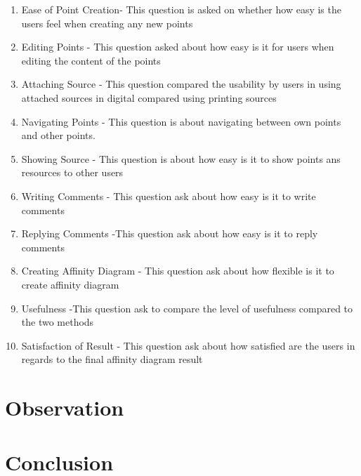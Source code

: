 \documentclass{sigchi}
\begin{document}
\begin{itemize}
\begin{itemize}
\begin{enumerate}
  \item Ease of Point Creation- This question is asked on whether how easy is the users feel when creating any new points 
  \item Editing Points - This question asked about how easy is it for users when editing the content of the points 
  \item Attaching Source - This question compared the  usability by users in using attached sources in digital compared using printing sources 
  \item Navigating Points - This question is about navigating between own points and other points. 
  \item Showing Source - This question is about how easy is it to show points ans resources to other users 
  \item Writing Comments - This question ask about how easy is it to write comments 
  \item Replying Comments -This question ask about how easy is it to reply  comments 
  \item Creating Affinity Diagram - This question ask about how flexible is it to create affinity diagram 
  \item Usefulness -This question ask to compare the level of usefulness compared to the two methods  
  \item Satisfaction of Result - This question ask about how satisfied are the users in regards to the final affinity diagram result   
\end{enumerate}



\section{Observation}





\section{Conclusion}


\end{itemize}
\end{itemize}
\end{document}
